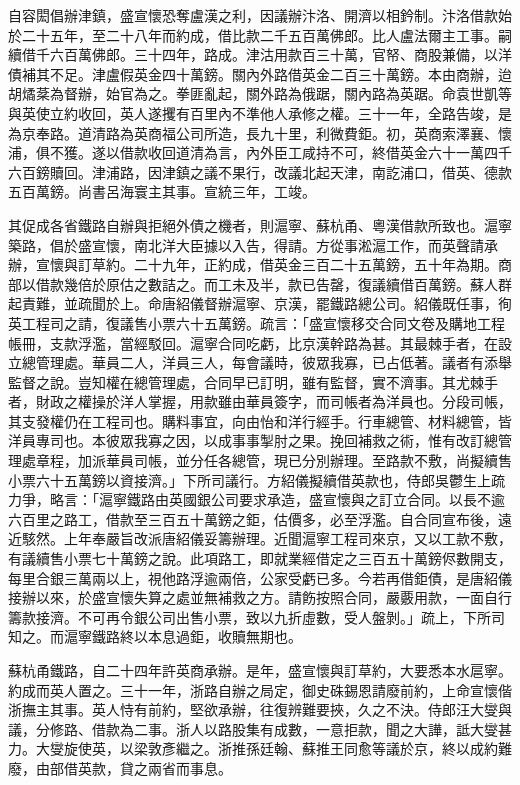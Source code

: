 \begin{pinyinscope}
自容閎倡辦津鎮，盛宣懷恐奪盧漢之利，因議辦汴洛、開濟以相鈐制。汴洛借款始於二十五年，至二十八年而約成，借比款二千五百萬佛郎。比人盧法爾主工事。嗣續借千六百萬佛郎。三十四年，路成。津沽用款百三十萬，官帑、商股兼備，以洋債補其不足。津盧假英金四十萬鎊。關內外路借英金二百三十萬鎊。本由商辦，迨胡燏棻為督辦，始官為之。拳匪亂起，關外路為俄踞，關內路為英踞。命袁世凱等與英使立約收回，英人遂攫有百里內不準他人承修之權。三十一年，全路告竣，是為京奉路。道清路為英商福公司所造，長九十里，利微費鉅。初，英商索澤襄、懷浦，俱不獲。遂以借款收回道清為言，內外臣工咸持不可，終借英金六十一萬四千六百鎊贖回。津浦路，因津鎮之議不果行，改議北起天津，南訖浦口，借英、德款五百萬鎊。尚書呂海寰主其事。宣統三年，工竣。

其促成各省鐵路自辦與拒絕外債之機者，則滬寧、蘇杭甬、粵漢借款所致也。滬寧築路，倡於盛宣懷，南北洋大臣據以入告，得請。方從事淞滬工作，而英聲請承辦，宣懷與訂草約。二十九年，正約成，借英金三百二十五萬鎊，五十年為期。商部以借款幾倍於原估之數詰之。而工未及半，款已告罄，復議續借百萬鎊。蘇人群起責難，並疏聞於上。命唐紹儀督辦滬寧、京漢，罷鐵路總公司。紹儀既任事，徇英工程司之請，復議售小票六十五萬鎊。疏言：「盛宣懷移交合同文卷及購地工程帳冊，支款浮濫，當經駁回。滬寧合同吃虧，比京漢幹路為甚。其最棘手者，在設立總管理處。華員二人，洋員三人，每會議時，彼眾我寡，已占低著。議者有添舉監督之說。豈知權在總管理處，合同早已訂明，雖有監督，實不濟事。其尤棘手者，財政之權操於洋人掌握，用款雖由華員簽字，而司帳者為洋員也。分段司帳，其支發權仍在工程司也。購料事宜，向由怡和洋行經手。行車總管、材料總管，皆洋員專司也。本彼眾我寡之因，以成事事掣肘之果。挽回補救之術，惟有改訂總管理處章程，加派華員司帳，並分任各總管，現已分別辦理。至路款不敷，尚擬續售小票六十五萬鎊以資接濟。」下所司議行。方紹儀擬續借英款也，侍郎吳鬱生上疏力爭，略言：「滬寧鐵路由英國銀公司要求承造，盛宣懷與之訂立合同。以長不逾六百里之路工，借款至三百五十萬鎊之鉅，估價多，必至浮濫。自合同宣布後，遠近駭然。上年奉嚴旨改派唐紹儀妥籌辦理。近聞滬寧工程司來京，又以工款不敷，有議續售小票七十萬鎊之說。此項路工，即就業經借定之三百五十萬鎊侭數開支，每里合銀三萬兩以上，視他路浮逾兩倍，公家受虧已多。今若再借鉅債，是唐紹儀接辦以來，於盛宣懷失算之處並無補救之方。請飭按照合同，嚴覈用款，一面自行籌款接濟。不可再令銀公司出售小票，致以九折虛數，受人盤剝。」疏上，下所司知之。而滬寧鐵路終以本息過鉅，收贖無期也。

蘇杭甬鐵路，自二十四年許英商承辦。是年，盛宣懷與訂草約，大要悉本水扈寧。約成而英人置之。三十一年，浙路自辦之局定，御史硃錫恩請廢前約，上命宣懷偕浙撫主其事。英人恃有前約，堅欲承辦，往復辨難要挾，久之不決。侍郎汪大燮與議，分修路、借款為二事。浙人以路股集有成數，一意拒款，聞之大譁，詆大燮甚力。大燮旋使英，以梁敦彥繼之。浙推孫廷翰、蘇推王同愈等議於京，終以成約難廢，由部借英款，貸之兩省而事息。


\end{pinyinscope}
